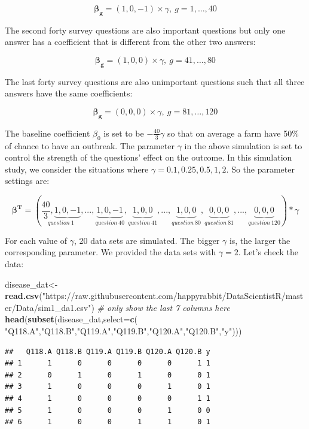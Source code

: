 \documentclass[12pt,]{krantz}
\makeatletter
\newenvironment{Shaded}{\begin{snugshade}}{\end{snugshade}}
\newcommand{\KeywordTok}[1]{\textcolor[rgb]{0.27,0.27,0.27}{\textbf{#1}}}
\newcommand{\DataTypeTok}[1]{\textcolor[rgb]{0.27,0.27,0.27}{#1}}
\newcommand{\StringTok}[1]{\textcolor[rgb]{0.5,0.5,0.5}{#1}}
\newcommand{\CommentTok}[1]{\textcolor[rgb]{0.37,0.37,0.37}{\textit{#1}}}
\newcommand{\NormalTok}[1]{#1}
\newenvironment{kframe}{%
\medskip{}
\setlength{\fboxsep}{.8em}
 \def\at@end@of@kframe{}%
 \ifinner\ifhmode%
  \def\at@end@of@kframe{\end{minipage}}%
  \begin{minipage}{\columnwidth}%
 \fi\fi%
 \def\FrameCommand##1{\hskip\@totalleftmargin \hskip-\fboxsep
 \colorbox{shadecolor}{##1}\hskip-\fboxsep
     \hskip-\linewidth \hskip-\@totalleftmargin \hskip\columnwidth}%
 \MakeFramed {\advance\hsize-\width
   \@totalleftmargin\z@ \linewidth\hsize
   \@setminipage}}%
 {\par\unskip\endMakeFramed%
 \at@end@of@kframe}
\renewenvironment{Shaded}{\begin{kframe}}{\end{kframe}}
\theoremstyle{definition}
\theoremstyle{definition}
\theoremstyle{definition}
\theoremstyle{remark}
\makeatother
\begin{document}
\[\mathbf{\beta_g}=(1,0,-1)\times \gamma,\ g=1,\dots,40\]

The second forty survey questions are also important questions but only
one answer has a coefficient that is different from the other two
answers:

\[\mathbf{\beta_g}=(1,0,0)\times \gamma,\ g=41,\dots,80\]

The last forty survey questions are also unimportant questions such that
all three answers have the same coefficients:

\[\mathbf{\beta_g}=(0,0,0)\times \gamma,\ g=81,\dots,120\]

The baseline coefficient \(\beta_0\) is set to be
\(-\frac{40}{3}\gamma\) so that on average a farm have 50\% of chance to
have an outbreak. The parameter \(\gamma\) in the above simulation is
set to control the strength of the questions' effect on the outcome. In
this simulation study, we consider the situations where
\(\gamma = 0.1, 0.25, 0.5, 1, 2\). So the parameter settings are:

\[\mathbf{\beta^{T}}=\left(\underset{question\ 1}{\frac{40}{3},\underbrace{1,0,-1}},...,\underset{question\ 40}{\underbrace{1,0,-1}},\underset{question\ 41}{\underbrace{1,0,0}},...,\underset{question\ 80}{\underbrace{1,0,0}},\underset{question\ 81}{\underbrace{0,0,0}},...,\underset{question\ 120}{\underbrace{0,0,0}}\right)*\gamma\]

For each value of \(\gamma\), 20 data sets are simulated. The bigger
\(\gamma\) is, the larger the corresponding parameter. We provided the
data sets with \(\gamma = 2\). Let's check the data:

\begin{Shaded}
\begin{Highlighting}[]
\NormalTok{disease_dat<-}\KeywordTok{read.csv}\NormalTok{(}\StringTok{"https://raw.githubusercontent.com/happyrabbit/DataScientistR/master/Data/sim1_da1.csv"}\NormalTok{)}
\CommentTok{# only show the last 7 columns here}
\KeywordTok{head}\NormalTok{(}\KeywordTok{subset}\NormalTok{(disease_dat,}\DataTypeTok{select=}\KeywordTok{c}\NormalTok{( }\StringTok{"Q118.A"}\NormalTok{,}\StringTok{"Q118.B"}\NormalTok{,}\StringTok{"Q119.A"}\NormalTok{,}\StringTok{"Q119.B"}\NormalTok{,}\StringTok{"Q120.A"}\NormalTok{,}\StringTok{"Q120.B"}\NormalTok{,}\StringTok{"y"}\NormalTok{))) }
\end{Highlighting}
\end{Shaded}

\begin{verbatim}
##   Q118.A Q118.B Q119.A Q119.B Q120.A Q120.B y
## 1      1      0      0      0      0      1 1
## 2      0      1      0      1      0      0 1
## 3      1      0      0      0      1      0 1
## 4      1      0      0      0      0      1 1
## 5      1      0      0      0      1      0 0
## 6      1      0      0      1      1      0 1
\end{verbatim}
\end{document}

